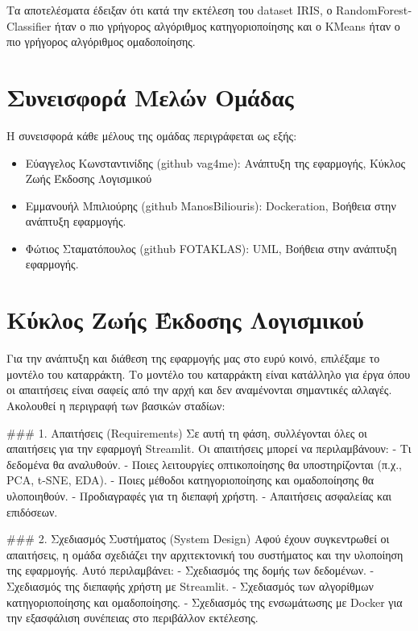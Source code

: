 \documentclass[a4paper,12pt]{article}
\begin{document}
\begin{itemize}
Τα αποτελέσματα έδειξαν ότι κατά την εκτέλεση του dataset \textlatin{IRIS}, ο \textlatin{RandomForestClassifier} ήταν ο πιο γρήγορος αλγόριθμος κατηγοριοποίησης και ο \textlatin{KMeans} ήταν ο πιο γρήγορος αλγόριθμος ομαδοποίησης.

\section{Συνεισφορά Μελών Ομάδας}
\label{sec:contribution}
Η συνεισφορά κάθε μέλους της ομάδας περιγράφεται ως εξής:
\begin{itemize}
    \item Εύαγγελος Κωνσταντινίδης \textlatin{(github vag4me)}: Ανάπτυξη της εφαρμογής, Κύκλος Ζωής Έκδοσης Λογισμικού
    \item Εμμανουήλ Μπιλιούρης \textlatin{(github ManosBiliouris)}: \textlatin{Dockeration}, Βοήθεια στην ανάπτυξη εφαρμογής.
    \item Φώτιος Σταματόπουλος \textlatin{(github FOTAKLAS)}: \textlatin{UML}, Βοήθεια στην ανάπτυξη εφαρμογής.
\end{itemize}

\section{Κύκλος Ζωής Έκδοσης Λογισμικού}
\label{sec:software_lifecycle}
Για την ανάπτυξη και διάθεση της εφαρμογής μας στο ευρύ κοινό, επιλέξαμε το μοντέλο του καταρράκτη. Το μοντέλο του καταρράκτη είναι κατάλληλο για έργα όπου οι απαιτήσεις είναι σαφείς από την αρχή και δεν αναμένονται σημαντικές αλλαγές. Ακολουθεί η περιγραφή των βασικών σταδίων:

### 1. Απαιτήσεις (\textlatin{Requirements})
Σε αυτή τη φάση, συλλέγονται όλες οι απαιτήσεις για την εφαρμογή \textlatin{Streamlit}. Οι απαιτήσεις μπορεί να περιλαμβάνουν:
- Τι δεδομένα θα αναλυθούν.
- Ποιες λειτουργίες οπτικοποίησης θα υποστηρίζονται (π.χ., \textlatin{PCA}, \textlatin{t-SNE}, \textlatin{EDA}).
- Ποιες μέθοδοι κατηγοριοποίησης και ομαδοποίησης θα υλοποιηθούν.
- Προδιαγραφές για τη διεπαφή χρήστη.
- Απαιτήσεις ασφαλείας και επιδόσεων.



\par\vspace{10pt}

### 2. Σχεδιασμός Συστήματος (\textlatin{System Design})
Αφού έχουν συγκεντρωθεί οι απαιτήσεις, η ομάδα σχεδιάζει την αρχιτεκτονική του συστήματος και την υλοποίηση της εφαρμογής. Αυτό περιλαμβάνει:
- Σχεδιασμός της δομής των δεδομένων.
- Σχεδιασμός της διεπαφής χρήστη με \textlatin{Streamlit}.
- Σχεδιασμός των αλγορίθμων κατηγοριοποίησης και ομαδοποίησης.
- Σχεδιασμός της ενσωμάτωσης με \textlatin{Docker} για την εξασφάλιση συνέπειας στο περιβάλλον εκτέλεσης.




\end{itemize}
\end{document}
